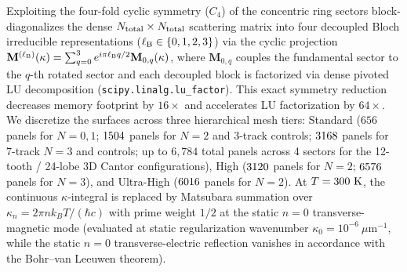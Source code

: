 \documentclass[pdflatex,sn-nature]{sn-jnl}
\begin{document}
Exploiting the four-fold cyclic symmetry ($C_4$) of the concentric ring sectors block-diagonalizes the dense $N_{\rm total} \times N_{\rm total}$ scattering matrix into four decoupled Bloch irreducible representations ($\ell_{\rm B} \in \{0, 1, 2, 3\}$) via the cyclic projection $\mathbf{M}^{(\ell_{\rm B})}(\kappa) = \sum_{q=0}^{3} e^{i\pi \ell_{\rm B} q/2}\mathbf{M}_{0,q}(\kappa)$, where $\mathbf{M}_{0,q}$ couples the fundamental sector to the $q$-th rotated sector and each decoupled block is factorized via dense pivoted LU decomposition (\texttt{scipy.linalg.lu\_factor}). This exact symmetry reduction decreases memory footprint by $16\times$ and accelerates LU factorization by $64\times$. We discretize the surfaces across three hierarchical mesh tiers: Standard ($656$ panels for $N=0,1$; $1504{}$ panels for $N=2$ and 3-track controls; $3168{}$ panels for 7-track $N=3$ and controls; up to $6{,}784$ total panels across 4 sectors for the 12-tooth / 24-lobe 3D Cantor configurations), High ($3120{}$ panels for $N=2$; $6576{}$ panels for $N=3$), and Ultra-High ($6016{}$ panels for $N=2$). At $T = 300{}\text{ K}$, the continuous $\kappa$-integral is replaced by Matsubara summation over $\kappa_n = 2\pi n k_B T / (\hbar c)$ with prime weight $1/2$ at the static $n=0$ transverse-magnetic mode (evaluated at static regularization wavenumber $\kappa_0 = 10^{-6}\ \mu\text{m}^{-1}$, while the static $n=0$ transverse-electric reflection vanishes in accordance with the Bohr--van Leeuwen theorem).
\end{document}
